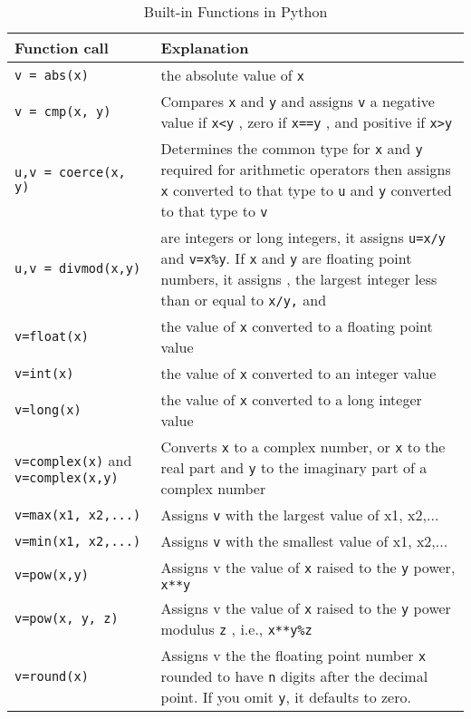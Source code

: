 \begin{longtable}{l|p{7cm}}
\caption{Built-in Functions in Python}
\label{table:builtin-functions-python}\\
%
\toprule
Function call & Explanation \\
%
\midrule
\verb"v = abs(x)" & the absolute value of \texttt{x} \\
%
\midrule
\verb"v = cmp(x, y)" & Compares \texttt{x} and \texttt{y} and
assigns \texttt{v} a negative value if \texttt{x\textless{}y} , zero if
\texttt{x==y} , and positive if \texttt{x\textgreater{}y} \\
%
\midrule
\verb"u,v = coerce(x, y)" & Determines the common type for
\texttt{x} and \texttt{y} required for arithmetic operators then assigns
\texttt{x} converted to that type to \texttt{u} and \texttt{y} converted to
that type to \texttt{v} \\
%
\midrule
\verb"u,v = divmod(x,y)" & are integers or long integers, it assigns \texttt{u=x/y} and \texttt{v=x\%y}.
If \texttt{x} and \texttt{y} are floating point numbers, it assigns
, the largest integer less than or equal to \texttt{x/y,} and \\
%
\midrule
\verb"v=float(x)" & the value of \texttt{x} converted to a floating point value \\
%
\midrule
\verb"v=int(x)" & the value of \texttt{x} converted to an integer value \\
%
\midrule
\verb"v=long(x)" & the value of \texttt{x} converted to a long integer value \\
%
\midrule
\verb"v=complex(x)" and \verb"v=complex(x,y)" & Converts \texttt{x} to a complex
number, or \texttt{x} to the real part and \texttt{y} to the imaginary part of a complex number \\
%
\midrule
\verb"v=max(x1, x2,...)"  &  Assigns \texttt{v}  with the largest value of x1, x2,... \\
%
\midrule
\verb"v=min(x1, x2,...)"  &  Assigns \texttt{v}  with the smallest value of x1, x2,... \\
%
\midrule
\verb"v=pow(x,y)"  & Assigns v the value of \texttt{x} raised to the \texttt{y} power, \texttt{x**y} \\
%
\midrule
\verb"v=pow(x, y, z)" & Assigns v  the value of \texttt{x} raised to the \texttt{y} power modulus \texttt{z} , i.e., \texttt{x**y\%z} \\
%
\midrule
\verb"v=round(x)" &  Assigns v the the floating point number \texttt{x} rounded to have \texttt{n} digits after the decimal
point. If you omit \texttt{y}, it defaults to zero. \\
%
\bottomrule
\end{longtable}

